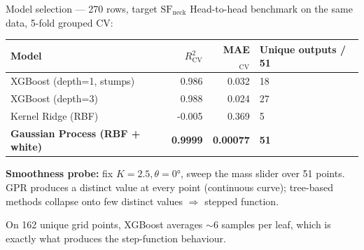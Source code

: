 \begin{frame}{Model selection --- 270 rows, target \(\mathrm{SF}_{\text{neck}}\)}
  Head-to-head benchmark on the same data, 5-fold grouped CV:
  \begin{center}\footnotesize
    \begin{tabular}{lrrl}
      \toprule
      Model & \(R^2_{\text{CV}}\) & MAE\(_{\text{CV}}\) & Unique outputs / 51 \\
      \midrule
      XGBoost (depth=1, stumps) & 0.986 & 0.032 & 18 \\
      XGBoost (depth=3)         & 0.988 & 0.024 & 27 \\
      Kernel Ridge (RBF)        & -0.005 & 0.369 & 5 \\
      \alert{\textbf{Gaussian Process (RBF + white)}} & \alert{\textbf{0.9999}} & \alert{\textbf{0.00077}} & \alert{\textbf{51}} \\
      \bottomrule
    \end{tabular}
  \end{center}

  \vspace{0.4cm}
  \textbf{Smoothness probe:} fix \(K=2.5, \theta=0°\), sweep the mass
  slider over 51 points. GPR produces a distinct value at every point
  (continuous curve); tree-based methods collapse onto few distinct
  values \(\Rightarrow\) \alert{stepped} function.

  \vspace{0.3cm}
  \footnotesize
  On 162 unique grid points, XGBoost averages \(\sim 6\) samples per leaf,
  which is exactly what produces the step-function behaviour.
\end{frame}

